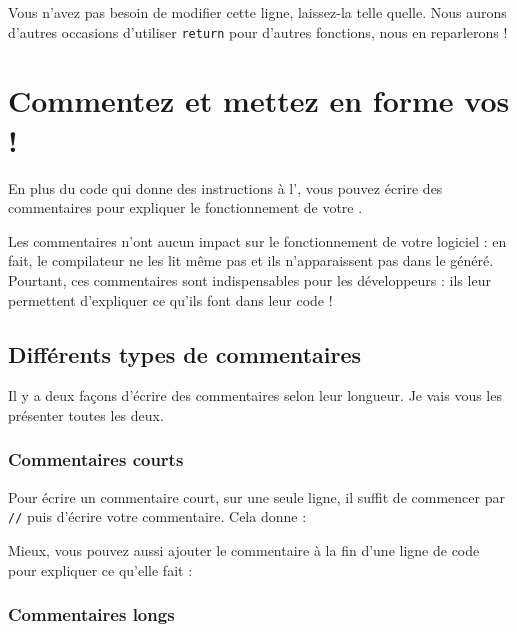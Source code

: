 Vous n'avez pas besoin de modifier cette ligne, laissez-la telle quelle. Nous aurons d'autres occasions d'utiliser \lstinline|return| pour d'autres fonctions, nous en reparlerons !

\section{Commentez et mettez en forme vos \progs !}
En plus du code qui donne des instructions à l'\ordi, vous pouvez écrire des commentaires pour expliquer le fonctionnement de votre \prog.

Les commentaires n'ont aucun impact sur le fonctionnement de votre logiciel : en fait, le compilateur ne les lit même pas et ils n'apparaissent pas dans le \prog généré. Pourtant, ces commentaires sont indispensables pour les développeurs : ils leur permettent d'expliquer ce qu'ils font dans leur code !

\subsection{Différents types de commentaires}
Il y a deux façons d'écrire des commentaires selon leur longueur. Je vais vous les présenter toutes les deux.

\subsubsection{Commentaires courts}
Pour écrire un commentaire court, sur une seule ligne, il suffit de commencer par \lstinline|//| puis d'écrire votre commentaire. Cela donne :


Mieux, vous pouvez aussi ajouter le commentaire à la fin d'une ligne de code pour expliquer ce qu'elle fait :


\subsubsection{Commentaires longs}


